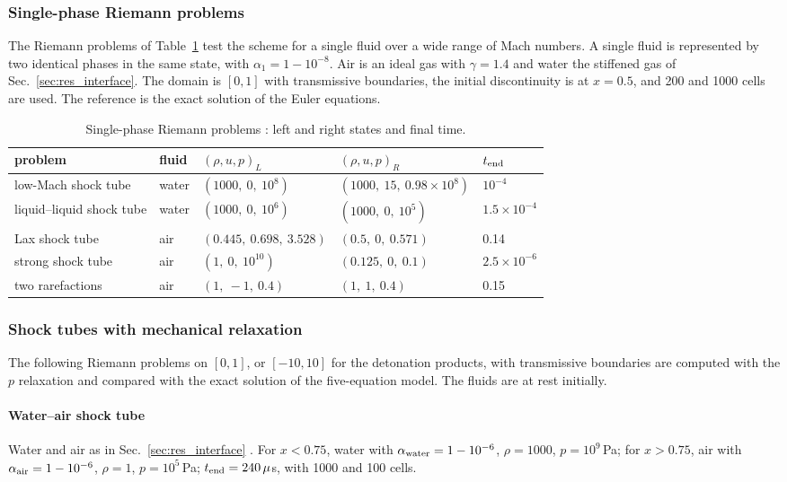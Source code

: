\documentclass[a4paper,fleqn]{cas-sc}
\begin{document}
\subsubsection{Single-phase Riemann problems}
\label{sec:res_single}
The Riemann problems of Table~\ref{tab:single} \cite[Secs.~5.1, 5.1.1]{Schropff2026} test the scheme for a single fluid over a wide
range of Mach numbers. A single fluid is represented by two identical phases in the same state, with
$\alpha_1=1-10^{-8}$. Air is an ideal gas with $\gamma=1.4$ and water the stiffened gas of Sec.~\ref{sec:res_interface}. The
domain is $[0,1]$ with transmissive boundaries, the initial discontinuity is at $x=0.5$, and 200 and 1000 cells are
used. The reference is the exact solution of the Euler equations.
\begin{table}[t]
\centering\small
\caption{Single-phase Riemann problems \cite{Schropff2026}: left and right states and final time.}
\label{tab:single}
\begin{tabular}{lllll}
\toprule
problem & fluid & $(\rho,u,p)_L$ & $(\rho,u,p)_R$ & $t_{\rm end}$ \\
\midrule
low-Mach shock tube & water & $(1000,\ 0,\ 10^8)$ & $(1000,\ 15,\ 0.98\times10^8)$ & $10^{-4}$ \\
liquid--liquid shock tube & water & $(1000,\ 0,\ 10^6)$ & $(1000,\ 0,\ 10^5)$ & $1.5\times10^{-4}$ \\
Lax shock tube & air & $(0.445,\ 0.698,\ 3.528)$ & $(0.5,\ 0,\ 0.571)$ & 0.14 \\
strong shock tube & air & $(1,\ 0,\ 10^{10})$ & $(0.125,\ 0,\ 0.1)$ & $2.5\times10^{-6}$ \\
two rarefactions & air & $(1,\ -1,\ 0.4)$ & $(1,\ 1,\ 0.4)$ & 0.15 \\
\bottomrule
\end{tabular}
\end{table}

\subsubsection{Shock tubes with mechanical relaxation}
\label{sec:res_shock}
The following Riemann problems on $[0,1]$, or $[-10,10]$ for the detonation products, with transmissive boundaries
are computed with the $p$ relaxation and compared with the exact solution of the five-equation model. The fluids are
at rest initially.

\paragraph{Water--air shock tube}
Water and air as in Sec.~\ref{sec:res_interface} \cite[Sec.~4.3.1]{SPB2009}. For $x<0.75$, water with
$\alpha_{\rm water}=1-10^{-6}$, $\rho=1000$, $p=10^9$\,Pa; for $x>0.75$, air with $\alpha_{\rm air}=1-10^{-6}$, $\rho=1$, $p=10^5$\,Pa;
$t_{\rm end}=240\,\mu$s, with 1000 and 100 cells.
\end{document}
